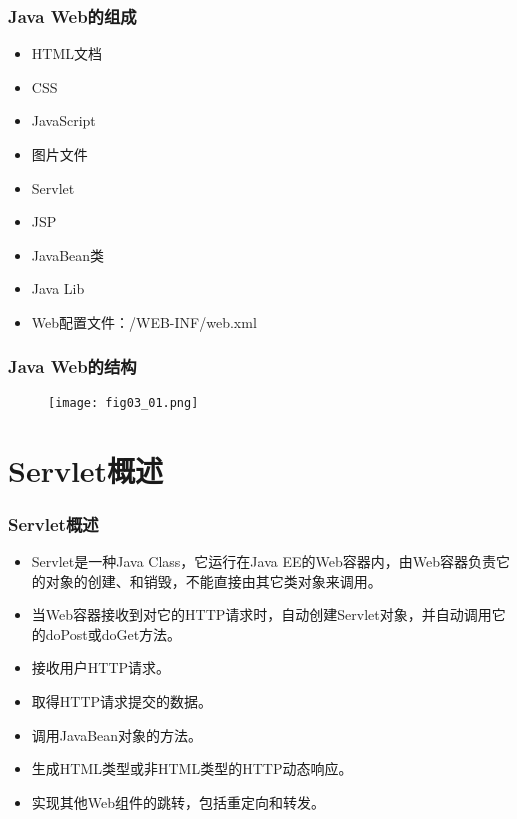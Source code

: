 \begin{frame}
\frametitle{Java Web的组成} 
\begin{itemize}
\item HTML文档
\item CSS
\item JavaScript
\item 图片文件
\item Servlet
\item JSP
\item JavaBean类
\item Java Lib
\item Web配置文件：/WEB-INF/web.xml
\end{itemize}
\end{frame}

\begin{frame}
\frametitle{Java Web的结构} 
\begin{figure}
\centering
\texttt{[image: fig03\_01.png]}
\end{figure}
\end{frame}

\section{Servlet概述}

\begin{frame}
\frametitle{Servlet概述}
\begin{itemize}
\item Servlet是一种Java Class，它运行在Java EE的Web容器内，由Web容器负责它的对象的创建、和销毁，不能直接由其它类对象来调用。
\item 当Web容器接收到对它的HTTP请求时，自动创建Servlet对象，并自动调用它的doPost或doGet方法。
\end{itemize}

\begin{itemize}
\item 接收用户HTTP请求。
\item 取得HTTP请求提交的数据。
\item 调用JavaBean对象的方法。
\item 生成HTML类型或非HTML类型的HTTP动态响应。
\item 实现其他Web组件的跳转，包括重定向和转发。
\end{itemize}
\end{frame}

